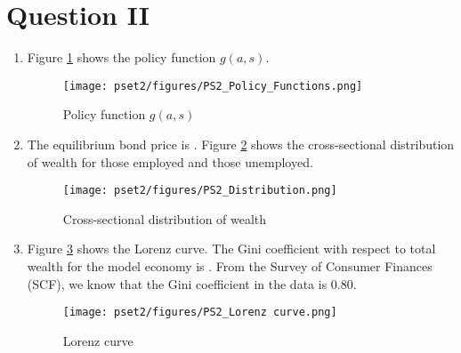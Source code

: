\documentclass[12pt]{article}
\begin{document}
\section*{Question II}
\begin{enumerate}[label=(\alph*)]
    \item Figure \ref{fig:ii.a} shows the policy function $g(a,s)$.
    \begin{figure}[h!]
        \centering
        \texttt{[image: pset2/figures/PS2\_Policy\_Functions.png]}
        \caption{Policy function $g(a,s)$}
        \label{fig:ii.a}
    \end{figure}
    
    \item The equilibrium bond price is . Figure \ref{fig:ii.b} shows the  cross-sectional distribution of wealth for those employed and those unemployed. 
    \begin{figure}[h!]
        \centering
        \texttt{[image: pset2/figures/PS2\_Distribution.png]}
        \caption{Cross-sectional distribution of wealth}
        \label{fig:ii.b}
    \end{figure}
    
    \item Figure \ref{fig:ii.c} shows the Lorenz curve. The Gini coefficient with respect to total wealth for the model economy is . From the Survey of Consumer Finances (SCF), we know that the Gini coefficient in the data is 0.80.
    \begin{figure}[h!]
        \centering
        \texttt{[image: pset2/figures/PS2\_Lorenz curve.png]}
        \caption{Lorenz curve}
        \label{fig:ii.c}
    \end{figure}
\end{enumerate}
%
\end{document}
